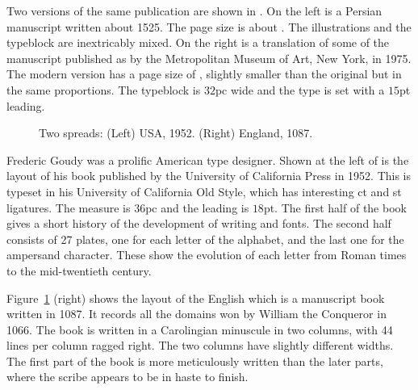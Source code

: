 \documentclass[10pt,a4paper,extrafontsizes]{memoir}
\begin{document}
\begin{paracol}{2}
\switchEng
     Two versions of the same publication are shown in .
On the left is a Persian manuscript  written
about 1525. The page size is about . The 
illustrations and
the typeblock are inextricably mixed. On the right is a translation of
some of the manuscript published as 
by the Metropolitan Museum of Art, New York, in 1975. The modern version
has a page size of , slightly smaller than the original
but in the same proportions. The typeblock is $32$pc wide 
and the type is set with a $15$pt leading.
\end{paracol}

\begin{figure}
\centering
\begin{minipage}[b]{\pwlayi}
\end{minipage}
\hfill
\begin{minipage}[b]{\pwlayi}
\end{minipage}
\caption[Two spreads: USA, 1952 and England, 1087]%
        {Two spreads: (Left) USA, 1952.
         (Right) England, 1087.} \label{fb:11}
\end{figure}

\begin{paracol}{2}
\switchEng
    Frederic Goudy was a prolific American 
type designer. Shown at the left of
 is the layout of his book  published by the University of California Press in 1952.
This is typeset in his University of California Old 
Style, which has
interesting ct and st ligatures. The measure is $36$pc and the leading
is $18$pt. The first half of the book gives a short history of the development
of writing and fonts. The second half consists of 27 plates, one for each 
letter of the alphabet, and the last one for the ampersand character. These 
show the evolution of each letter from Roman times to the mid-twentieth
century.


    Figure~\ref{fb:11} (right) shows the layout of the English 
 which is a manuscript book written in 1087. 
It records all the domains won by William the Conqueror in 1066. 
The book is written in a Carolingian minuscule
in two columns, with 44 lines per column ragged right. 
The two columns have slightly different widths. The first part of the book 
is more meticulously written than the later parts, where the scribe appears 
to be in haste to finish.
\end{paracol}
\end{document}
